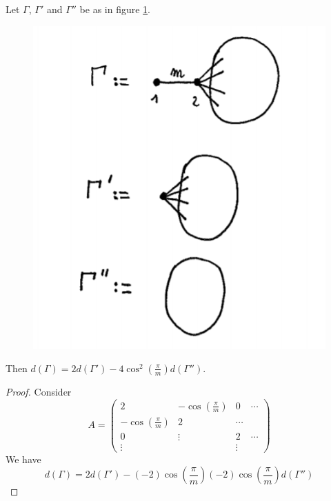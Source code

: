 \documentclass[envcountsame,envcountchap]{svmono}
\begin{document}
\begin{lemma}
Let $\Gamma$, $\Gamma '$ and $\Gamma ''$ be as in figure \ref{cours9fig1}.

\begin{figure}[h!]
\centering
\includegraphics[scale=0.6]{cours9fig1.png}
\caption{}
\label{cours9fig1}
\end{figure}    

Then $d(\Gamma) = 2 d(\Gamma ') - 4 \cos^2 \left(\frac{\pi}{m} \right) d (\Gamma '')$.
\end{lemma}

\begin{proof}
Consider
\begin{equation}
A = \begin{pmatrix}
2 &-\cos \left(\frac{\pi}{m} \right) &0 &\cdots \\
-\cos \left(\frac{\pi}{m} \right) &2 &\cdots & \\
0 &\vdots & 2 &\cdots \\
\vdots &  & \vdots
\end{pmatrix}
\end{equation} We have
\begin{equation}
d (\Gamma ) =2 d(\Gamma ') - (-2) \cos \left(\frac{\pi}{m} \right) (-2) \cos \left(\frac{\pi}{m} \right)  d (\Gamma '')
\end{equation}
\end{proof}
\end{document}
